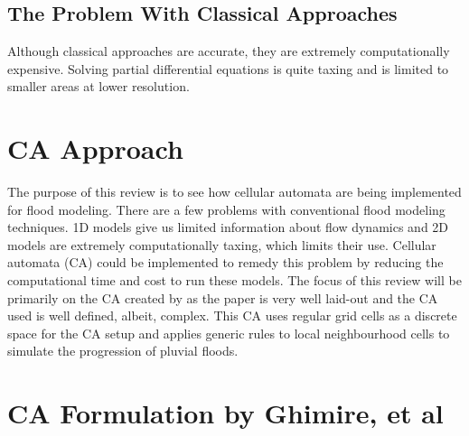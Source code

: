 \subsection{The Problem With Classical Approaches}
Although classical approaches are accurate, they are extremely computationally expensive. Solving partial differential equations is quite taxing and is limited to smaller areas at lower resolution. 

\section{CA Approach}
The purpose of this review is to see how cellular automata are being implemented for flood modeling. There are a few problems with conventional flood modeling techniques. 1D models give us limited information about flow dynamics and 2D models are extremely computationally taxing, which limits their use. Cellular automata (CA) could be implemented to remedy this problem by reducing the computational time and cost to run these models. The focus of this review will be primarily on the CA created by \cite{Ghimire} as the paper is very well laid-out and the CA used is well defined, albeit, complex. This CA uses regular grid cells as a discrete space for the CA setup and applies generic rules to local neighbourhood cells to simulate the progression of pluvial floods.


\section*{CA Formulation by Ghimire, et al}


